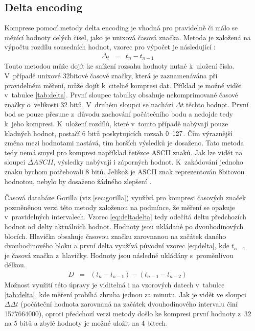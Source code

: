 \subsection{Delta encoding}\label{sec:delta}
Komprese pomocí metody delta encoding je vhodná pro pravidelně či málo se měnící hodnoty celých čísel, jako je unixová časová značka. Metoda je založená na výpočtu rozdílu sousedních hodnot, vzorec pro výpočet je následující \cite{smith2003digital}:
\begin{eqnarray}\label{eq:delta}
  \Delta_t & = & t_n-t_{n-1}
\end{eqnarray}
Touto metodou může dojít ke snížení rozsahu hodnoty nutné k~uložení čísla. V~případě unixové 32bitové časové značky, která je zaznamenávána při pravidelném měření, může dojít k~citelné kompresi dat. Příklad je možné vidět v~tabulce \ref{tab:delta}. První sloupec tabulky obsahuje nekomprimované časové značky o~velikosti 32 bitů. V~druhém sloupci se nachází $\Delta t$ těchto hodnot. První bod se pouze přesune z~důvodu zachování počátečního bodu a nedojde tedy k~jeho kompresi. K~uložení rozdílů, které v~tomto případě nabývají pouze kladných hodnot, postačí 6 bitů poskytujících rozsah $0\textup{--}127$. Čím výraznější změna mezi hodnotami nastává, tím horších výsledků je dosaženo. Tato metoda tedy nemá smysl pro kompresi například řetězce ASCII znaků. Jak lze vidět na sloupci $\Delta ASCII$, výsledky nabývají i záporných hodnot. K~zakódování jednoho znaku bychom potřebovali 8 bitů. Jelikož je ASCII znak reprezentován 8bitovou hodnotou, nebylo by dosaženo žádného zlepšení \cite{smith2003digital}.

Časová databáze Gorilla (viz \ref{sec:gorilla}) využívá pro kompresi časových značek pozměněnou verzi této metody založenou na podmínce, že měření se opakuje v~pravidelných intervalech. Vzorec \ref{eq:deltadelta} tedy odečítá deltu předchozích hodnot od delty aktuálních hodnot. Hodnoty jsou ukládané po dvouhodinových blocích. Hlavička obsahuje časovou značku zarovnanou na začátek daného dvouhodinového bloku a první delta využívá původní vzorec \ref{eq:delta}, kde $t_{n-1}$ je časová značka z~hlavičky. Hodnoty jsou následně ukládány s~proměnlivou délkou\cite{gorilla}. 
\begin{eqnarray}\label{eq:deltadelta}
  D & = & (t_n-t_{n-1})-(t_{n-1}-t_{n-2})
\end{eqnarray}
Možnost využití této úpravy je viditelná i na vzorových datech v~tabulce \ref{tab:delta}, kde měření probíhá zhruba jednou za minutu. Jak je vidět ve sloupci $\Delta\Delta t$ (počáteční hodnota zarovnaná na začátek dvouhodinového intervalu činí 1577664000), oproti předchozí verzi metody došlo ke kompresi první hodnoty z~32 na 5 bitů a zbylé hodnoty je možné uložit na 4 bitech.

